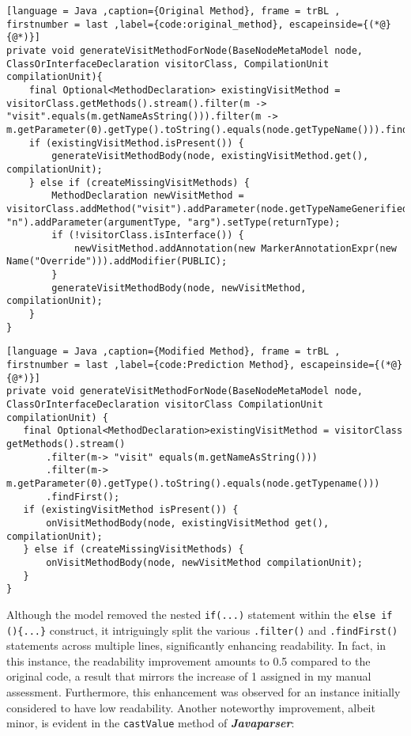 \begin{lstlisting}[language = Java ,caption={Original Method}, frame = trBL , firstnumber = last ,label={code:original_method}, escapeinside={(*@}{@*)}]
private void generateVisitMethodForNode(BaseNodeMetaModel node, ClassOrInterfaceDeclaration visitorClass, CompilationUnit compilationUnit){
    final Optional<MethodDeclaration> existingVisitMethod = visitorClass.getMethods().stream().filter(m -> "visit".equals(m.getNameAsString())).filter(m -> m.getParameter(0).getType().toString().equals(node.getTypeName())).findFirst();
    if (existingVisitMethod.isPresent()) {
        generateVisitMethodBody(node, existingVisitMethod.get(), compilationUnit);
    } else if (createMissingVisitMethods) {
        MethodDeclaration newVisitMethod = visitorClass.addMethod("visit").addParameter(node.getTypeNameGenerified(), "n").addParameter(argumentType, "arg").setType(returnType);
        if (!visitorClass.isInterface()) {
            newVisitMethod.addAnnotation(new MarkerAnnotationExpr(new Name("Override"))).addModifier(PUBLIC);
        }
        generateVisitMethodBody(node, newVisitMethod, compilationUnit);
    }
}
\end{lstlisting}
\begin{lstlisting}[language = Java ,caption={Modified Method}, frame = trBL , firstnumber = last ,label={code:Prediction Method}, escapeinside={(*@}{@*)}]
private void generateVisitMethodForNode(BaseNodeMetaModel node, ClassOrInterfaceDeclaration visitorClass CompilationUnit compilationUnit) { 
   final Optional<MethodDeclaration>existingVisitMethod = visitorClass getMethods().stream() 
       .filter(m-> "visit" equals(m.getNameAsString())) 
       .filter(m-> m.getParameter(0).getType().toString().equals(node.getTypename())) 
       .findFirst(); 
   if (existingVisitMethod isPresent()) { 
       onVisitMethodBody(node, existingVisitMethod get(), compilationUnit); 
   } else if (createMissingVisitMethods) { 
       onVisitMethodBody(node, newVisitMethod compilationUnit); 
   } 
} 
\end{lstlisting}
Although the model removed the nested \texttt{if(...)} statement within the \texttt{else if ()\{...\}} construct, it intriguingly split the various \texttt{.filter()} and \texttt{.findFirst()} statements across multiple lines, significantly enhancing readability. In fact, in this instance, the readability improvement amounts to 0.5 compared to the original code, a result that mirrors the increase of 1 assigned in my manual assessment. Furthermore, this enhancement was observed for an instance initially considered to have low readability. Another noteworthy improvement, albeit minor, is evident in the \texttt{castValue} method of \textbf{\textit{Javaparser}}:
